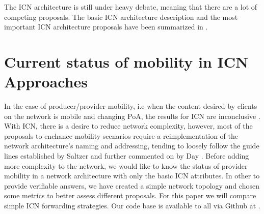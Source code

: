 \documentclass[twocolumn, a4paper]{ieicejsp}
\begin{document}

The ICN architecture is still under heavy debate, meaning that there are a lot
of competing proposals. 
The basic ICN architecture description and the most important ICN architecture
proposals have been summarized in \cite{6563278}. 

\section{Current status of mobility in ICN Approaches}


In the case of producer/provider mobility, i.e when the content desired by
clients on the network is mobile and changing PoA, the results for ICN are
inconclusive \cite{Tyson:2012:SMI:2248361.2248363}. With ICN, there is a 
desire to reduce network complexity, however, most of the proposals to enchance
mobility scenarios require a reimplementation of the network architecture's
naming and addressing, tending to loosely follow the guide lines
established by Saltzer \cite{saltzer:namingandbindingnetworks} and further
commented on by Day \cite{Day:2008:PNA:1349793}. Before adding more complexity
to the network, we would like to know the status of provider mobility in a network
architecture with only the basic ICN attributes. In other to provide verifiable
answers, we have created a simple network topology and chosen some metrics to
better assess different proposals. For this paper we will compare simple ICN 
forwarding strategies. Our code base is available to all via Github at
\cite{githubndnmobi}.
\end{document}
